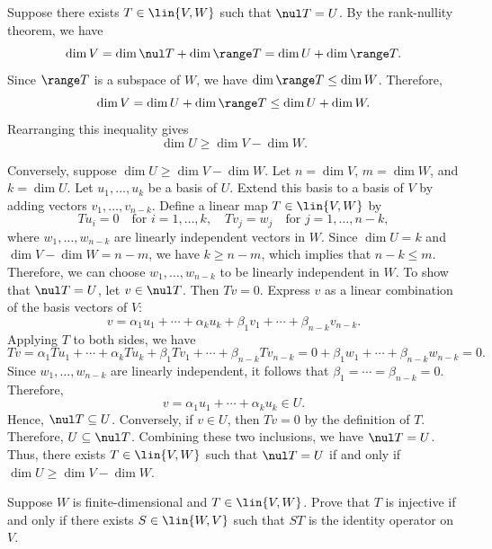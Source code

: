 \begin{sol}
    Suppose there exists $T \in \lin{V, W}$ such that $\nul T = U$. By the rank-nullity theorem, we have
    \[\dim V = \dim \nul T + \dim \range T = \dim U + \dim \range T.\]
    Since $\range T$ is a subspace of $W$, we have $\dim \range T \leq \dim W$. Therefore,
    \[\dim V = \dim U + \dim \range T \leq \dim U + \dim W.\]
    Rearranging this inequality gives
    \[\dim U \geq \dim V - \dim W.\]

    Conversely, suppose $\dim U \geq \dim V - \dim W$. Let $n = \dim V$, $m = \dim W$, and $k = \dim U$. Let $u_1, \ldots, u_k$ be a basis of $U$. Extend this basis to a basis of $V$ by adding vectors $v_1, \ldots, v_{n - k}$. Define a linear map $T \in \lin{V, W}$ by
    \[Tu_i = 0 \quad \text{for } i = 1, \ldots, k, \quad Tv_j = w_j \quad \text{for } j = 1, \ldots, n - k,\]
    where $w_1, \ldots, w_{n - k}$ are linearly independent vectors in $W$. Since $\dim U = k$ and $\dim V - \dim W = n - m$, we have $k \geq n - m$, which implies that $n - k \leq m$. Therefore, we can choose $w_1, \ldots, w_{n - k}$ to be linearly independent in $W$. To show that $\nul T = U$, let $v \in \nul T$. Then $Tv = 0$. Express $v$ as a linear combination of the basis vectors of $V$:
    \[v = \alpha_1 u_1 + \cdots + \alpha_k u_k + \beta_1 v_1 + \cdots + \beta_{n - k} v_{n - k}.\]
    Applying $T$ to both sides, we have
    \[Tv = \alpha_1 Tu_1 + \cdots + \alpha_k Tu_k + \beta_1 Tv_1 + \cdots + \beta_{n - k} Tv_{n - k} = 0 + \beta_1 w_1 + \cdots + \beta_{n - k} w_{n - k} = 0.\]
    Since $w_1, \ldots, w_{n - k}$ are linearly independent, it follows that $\beta_1 = \cdots = \beta_{n - k} = 0$. Therefore,
    \[v = \alpha_1 u_1 + \cdots + \alpha_k u_k \in U.\]
    Hence, $\nul T \subseteq U$. Conversely, if $v \in U$, then $Tv = 0$ by the definition of $T$. Therefore, $U \subseteq \nul T$. Combining these two inclusions, we have $\nul T = U$. Thus, there exists $T \in \lin{V, W}$ such that $\nul T = U$ if and only if $\dim U \geq \dim V - \dim W$.
\end{sol}

\begin{exercise}[3b19]
    Suppose $W$ is finite-dimensional and $T \in \lin{V, W}$. Prove that $T$ is injective if and only if there exists $S \in \lin{W, V}$ such that $ST$ is the identity operator on $V$.
\end{exercise}


